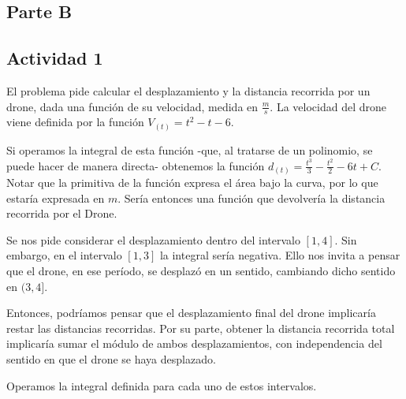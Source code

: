 \subsection*{Parte B}

\subsection*{Actividad 1}

El problema pide calcular el desplazamiento y la distancia recorrida por un drone,
dada una función de su velocidad, medida en $\frac{m}{s}$. 
La velocidad del drone viene definida por la función $V_{(t)} = t^2 - t - 6$.

\begin{center}
\end{center}

Si operamos la integral de esta función -que, al tratarse de un polinomio, se puede hacer de manera directa- obtenemos la función $d_{(t)} = \frac{t^3}{3} - \frac{t^2}{2} - 6t + C$. Notar que la primitiva de la función expresa el área bajo la curva, por lo que estaría expresada en $m$. Sería entonces una función que devolvería la distancia recorrida por el Drone.

Se nos pide considerar el desplazamiento dentro del intervalo $[1, 4]$. 
Sin embargo, en el intervalo $[1, 3]$ la integral sería negativa. 
Ello nos invita a pensar que el drone, en ese período, se desplazó en un sentido, cambiando dicho sentido en $(3, 4]$.

Entonces, podríamos pensar que el desplazamiento final del drone implicaría restar las distancias recorridas. Por su parte, obtener la distancia recorrida total implicaría sumar el módulo de ambos desplazamientos, con independencia del sentido en que el drone se haya desplazado.

Operamos la integral definida para cada uno de estos intervalos.

